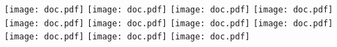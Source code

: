\documentclass{article}
\begin{document}
\centering
\texttt{[image: doc.pdf]}
\texttt{[image: doc.pdf]}
\texttt{[image: doc.pdf]}
\texttt{[image: doc.pdf]}
\texttt{[image: doc.pdf]}
\texttt{[image: doc.pdf]}
\texttt{[image: doc.pdf]}
\texttt{[image: doc.pdf]}
\texttt{[image: doc.pdf]}
\texttt{[image: doc.pdf]}
\texttt{[image: doc.pdf]}
\end{document}

